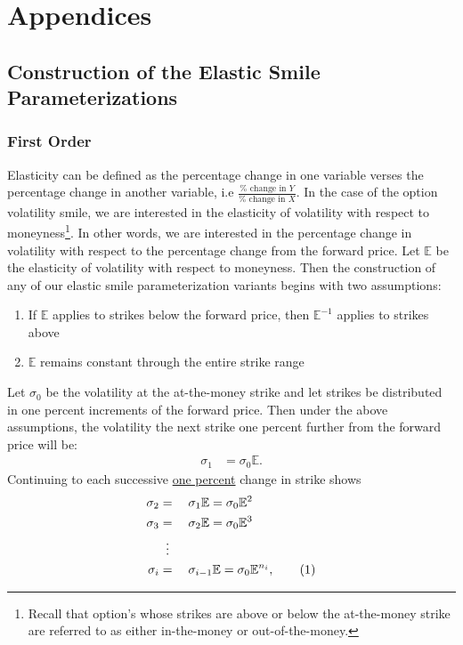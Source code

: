 \documentclass[12pt, a4paper, notitlepage]{article}
\numberwithin{equation}{subsection}
\numberwithin{figure}{subsection}
\numberwithin{table}{subsection}
\newcommand\numberthis{\addtocounter{equation}{1}\tag{\theequation}}
\newcommand{\newpar}{\newline \newline}
\begin{document}
\newpage
\section{Appendices} \label{Appendicies}

\subsection{Construction of the Elastic Smile Parameterizations} \label{appendix:ElasticSmileDerivation}
\subsubsection{First Order} \label{subsec:FirstOrderSmileConstruction}
Elasticity can be defined as the percentage change in one variable verses the percentage change in another variable, i.e $\frac{\% \text{ change in } Y}{\% \text{ change in } X}$.  In the case of the option volatility smile, we are interested in the elasticity of volatility with respect to moneyness\footnote{Recall that option's whose strikes are above or below the at-the-money strike are referred to as either in-the-money or out-of-the-money.}.  In other words, we are interested in the percentage change in volatility with respect to the percentage change from the forward price.
\newpar
Let $\mathbb{E}$ be the elasticity of volatility with respect to moneyness.  Then the construction of any of our elastic smile parameterization variants begins with two assumptions:
\begin{enumerate}
\item If $\mathbb{E}$ applies to strikes below the forward price, then $\mathbb{E}^{-1}$ applies to strikes above \label{SkewInvertedAssumption}
\item $\mathbb{E}$ remains constant through the entire strike range
\end{enumerate}
  Let $\sigma_0$ be the volatility at the at-the-money strike and let strikes be distributed in one percent increments of the forward price.  Then under the above assumptions, the volatility the next strike one percent further from the forward price will be:
\begin{align*}
    \sigma_1 &= \sigma_0\mathbb{E}.
\end{align*}
Continuing to each successive \underline{one percent} change in strike shows
\begin{alignat*}{3}
    \sigma_2 &= &&\sigma_1\mathbb{E} = \sigma_0\mathbb{E}^{2} \\
    \sigma_3 &= &&\sigma_2\mathbb{E} = \sigma_0\mathbb{E}^{3} \\
        &\vdotswithin{=}\\
    \sigma_i &= &&\sigma_{i-1}\mathbb{E} = \sigma_0\mathbb{E}^{n_i}, \numberthis \label{eq:FirstOrderIthStrikeVol}
\end{alignat*}
\end{document}
